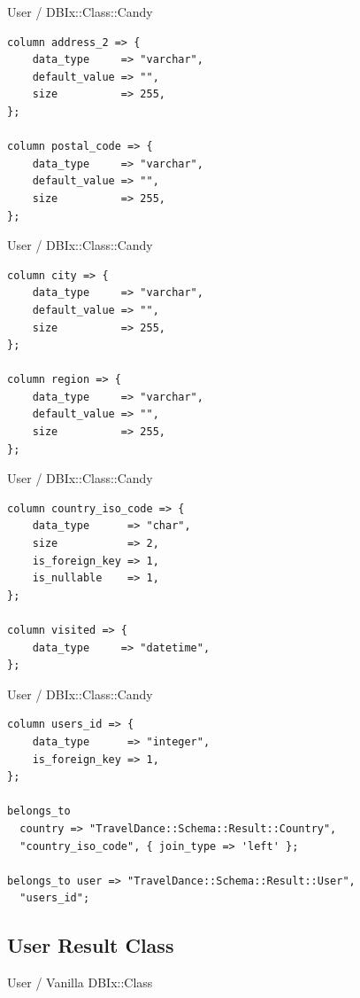 \begin{frame}[fragile]{User / DBIx::Class::Candy}
\begin{lstlisting}
column address_2 => {
    data_type     => "varchar",
    default_value => "",
    size          => 255,
};

column postal_code => {
    data_type     => "varchar",
    default_value => "",
    size          => 255,
};
\end{lstlisting}
\end{frame}

\begin{frame}[fragile]{User / DBIx::Class::Candy}
\begin{lstlisting}
column city => {
    data_type     => "varchar",
    default_value => "",
    size          => 255,
};

column region => {
    data_type     => "varchar",
    default_value => "",
    size          => 255,
};
\end{lstlisting}
\end{frame}

\begin{frame}[fragile]{User / DBIx::Class::Candy}
\begin{lstlisting}
column country_iso_code => {
    data_type      => "char",
    size           => 2,
    is_foreign_key => 1,
    is_nullable    => 1,
};

column visited => {
    data_type     => "datetime",
};
\end{lstlisting}
\end{frame}

\begin{frame}[fragile]{User / DBIx::Class::Candy}
\begin{lstlisting}
column users_id => {
    data_type      => "integer",
    is_foreign_key => 1,
};

belongs_to
  country => "TravelDance::Schema::Result::Country",
  "country_iso_code", { join_type => 'left' };

belongs_to user => "TravelDance::Schema::Result::User",
  "users_id";
\end{lstlisting}
\end{frame}

\subsection{User Result Class}

\begin{frame}[fragile]{User / Vanilla DBIx::Class}
\begin{lstlisting}

\end{lstlisting}
\end{frame}

